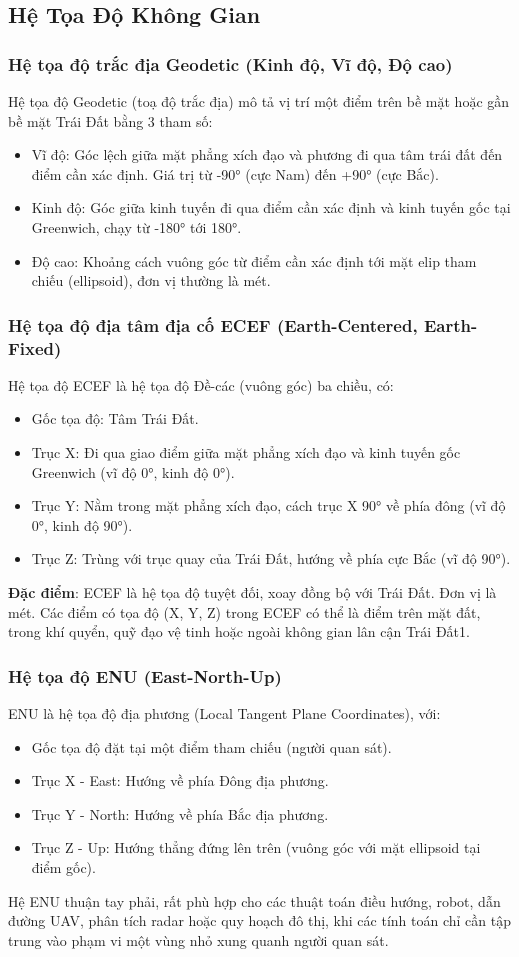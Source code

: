 \subsection{Hệ Tọa Độ Không Gian}
\subsubsection{Hệ tọa độ trắc địa Geodetic (Kinh độ, Vĩ độ, Độ cao)}
Hệ tọa độ Geodetic (toạ độ trắc địa) mô tả vị trí một điểm trên bề mặt hoặc gần bề mặt Trái Đất bằng 3 tham số:
\begin{itemize}
    \item Vĩ độ: Góc lệch giữa mặt phẳng xích đạo và phương đi qua tâm trái đất đến điểm cần xác định. Giá trị từ -90° (cực Nam) đến +90° (cực Bắc).
    \item Kinh độ: Góc giữa kinh tuyến đi qua điểm cần xác định và kinh tuyến gốc tại Greenwich, chạy từ -180° tới 180°.
    \item Độ cao: Khoảng cách vuông góc từ điểm cần xác định tới mặt elip tham chiếu (ellipsoid), đơn vị thường là mét.
\end{itemize}
\subsubsection{Hệ tọa độ địa tâm địa cố ECEF (Earth-Centered, Earth-Fixed)}
Hệ tọa độ ECEF là hệ tọa độ Đề-các (vuông góc) ba chiều, có:
\begin{itemize}
    \item Gốc tọa độ: Tâm Trái Đất.
    \item Trục X: Đi qua giao điểm giữa mặt phẳng xích đạo và kinh tuyến gốc Greenwich (vĩ độ 0°, kinh độ 0°).
    \item Trục Y: Nằm trong mặt phẳng xích đạo, cách trục X 90° về phía đông (vĩ độ 0°, kinh độ 90°).
    \item Trục Z: Trùng với trục quay của Trái Đất, hướng về phía cực Bắc (vĩ độ 90°).
\end{itemize}
\textbf{Đặc điểm}: ECEF là hệ tọa độ tuyệt đối, xoay đồng bộ với Trái Đất. Đơn vị là mét. Các điểm có tọa độ (X, Y, Z) trong ECEF có thể là điểm trên mặt đất, trong khí quyển, quỹ đạo vệ tinh hoặc ngoài không gian lân cận Trái Đất1.
\subsubsection{Hệ tọa độ ENU (East-North-Up)}
ENU là hệ tọa độ địa phương (Local Tangent Plane Coordinates), với:
\begin{itemize}
    \item Gốc tọa độ đặt tại một điểm tham chiếu (người quan sát).
    \item Trục X - East: Hướng về phía Đông địa phương.
    \item Trục Y - North: Hướng về phía Bắc địa phương.
    \item Trục Z - Up: Hướng thẳng đứng lên trên (vuông góc với mặt ellipsoid tại điểm gốc).
\end{itemize}
Hệ ENU thuận tay phải, rất phù hợp cho các thuật toán điều hướng, robot, dẫn đường UAV, phân tích radar hoặc quy hoạch đô thị, khi các tính toán chỉ cần tập trung vào phạm vi một vùng nhỏ xung quanh người quan sát.
